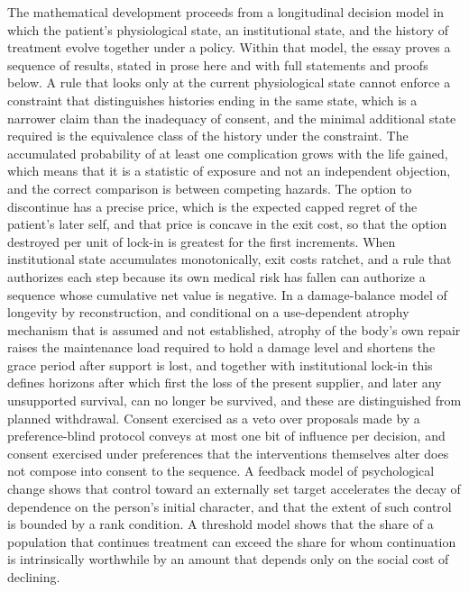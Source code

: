 \documentclass[11pt]{article}
\theoremstyle{plain}
\theoremstyle{definition}
\theoremstyle{remark}
\begin{document}
The mathematical development proceeds from a longitudinal decision model in which the patient's physiological state, an institutional state, and the history of treatment evolve together under a policy. Within that model, the essay proves a sequence of results, stated in prose here and with full statements and proofs below. A rule that looks only at the current physiological state cannot enforce a constraint that distinguishes histories ending in the same state, which is a narrower claim than the inadequacy of consent, and the minimal additional state required is the equivalence class of the history under the constraint. The accumulated probability of at least one complication grows with the life gained, which means that it is a statistic of exposure and not an independent objection, and the correct comparison is between competing hazards. The option to discontinue has a precise price, which is the expected capped regret of the patient's later self, and that price is concave in the exit cost, so that the option destroyed per unit of lock-in is greatest for the first increments. When institutional state accumulates monotonically, exit costs ratchet, and a rule that authorizes each step because its own medical risk has fallen can authorize a sequence whose cumulative net value is negative. In a damage-balance model of longevity by reconstruction, and conditional on a use-dependent atrophy mechanism that is assumed and not established, atrophy of the body's own repair raises the maintenance load required to hold a damage level and shortens the grace period after support is lost, and together with institutional lock-in this defines horizons after which first the loss of the present supplier, and later any unsupported survival, can no longer be survived, and these are distinguished from planned withdrawal. Consent exercised as a veto over proposals made by a preference-blind protocol conveys at most one bit of influence per decision, and consent exercised under preferences that the interventions themselves alter does not compose into consent to the sequence. A feedback model of psychological change shows that control toward an externally set target accelerates the decay of dependence on the person's initial character, and that the extent of such control is bounded by a rank condition. A threshold model shows that the share of a population that continues treatment can exceed the share for whom continuation is intrinsically worthwhile by an amount that depends only on the social cost of declining.
\end{document}
